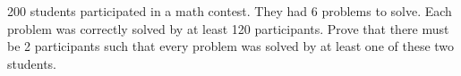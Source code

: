 200 students participated in a math contest. They had 6 problems to solve. Each problem was correctly solved by at least 120 participants. Prove that there must be 2 participants such that every problem was solved by at least one of these two students.